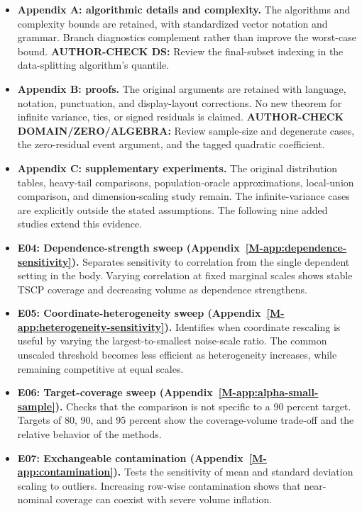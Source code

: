 \documentclass[10pt]{article}
\newcommand{\msapp}[1]{Appendix~\ref*{M-#1}}
\newcommand{\checkauthor}[2]{\textcolor{red!65!black}{\textbf{AUTHOR-CHECK #1:} #2}}
\begin{document}
\clearpage
\begin{itemize}
\item \textbf{Appendix A: algorithmic details and complexity.} The algorithms
and complexity bounds are retained, with standardized vector notation and
grammar. Branch diagnostics complement rather than improve the worst-case
bound. \checkauthor{DS}{Review the final-subset indexing in the data-splitting
algorithm's quantile.}

\item \textbf{Appendix B: proofs.} The original arguments are retained with
language, notation, punctuation, and display-layout corrections. No new
theorem for infinite variance, ties, or signed residuals is claimed.
\checkauthor{DOMAIN/ZERO/ALGEBRA}{Review sample-size and degenerate cases,
the zero-residual event argument, and the tagged quadratic coefficient.}

\item \textbf{Appendix C: supplementary experiments.} The original
distribution tables, heavy-tail comparisons, population-oracle
approximations, local-union comparison, and dimension-scaling study remain.
The infinite-variance cases are explicitly outside the stated assumptions.
The following nine added studies extend this evidence.
\item \textbf{E04: Dependence-strength sweep (\msapp{app:dependence-sensitivity}).}
Separates sensitivity to correlation from the single dependent setting in the body. Varying correlation at fixed marginal scales shows stable TSCP coverage and decreasing volume as dependence strengthens.

\item \textbf{E05: Coordinate-heterogeneity sweep (\msapp{app:heterogeneity-sensitivity}).}
Identifies when coordinate rescaling is useful by varying the largest-to-smallest noise-scale ratio. The common unscaled threshold becomes less efficient as heterogeneity increases, while remaining competitive at equal scales.

\item \textbf{E06: Target-coverage sweep (\msapp{app:alpha-small-sample}).}
Checks that the comparison is not specific to a 90 percent target. Targets of 80, 90, and 95 percent show the coverage-volume trade-off and the relative behavior of the methods.

\item \textbf{E07: Exchangeable contamination (\msapp{app:contamination}).}
Tests the sensitivity of mean and standard deviation scaling to outliers. Increasing row-wise contamination shows that near-nominal coverage can coexist with severe volume inflation.


\end{itemize}
\end{document}
